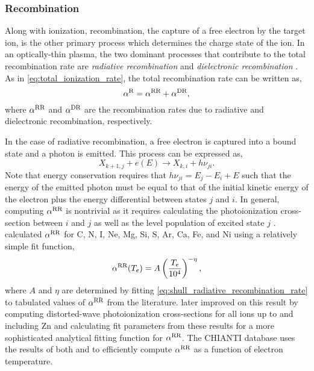 \subsubsection{Recombination}

Along with ionization, recombination, the capture of a free electron by the target ion, is the other primary process which determines the charge state of the ion. In an optically-thin plasma, the two dominant processes that contribute to the total recombination rate are \textit{radiative recombination} and \textit{dielectronic recombination} \citep{bradshaw_collisional_2013}. As in \autoref{eq:total_ionization_rate}, the total recombination rate can be written as,
\begin{equation}\label{eq:total_recombination_rate}
    \alpha^\textup{R} = \alpha^\textup{RR} + \alpha^\textup{DR},
\end{equation}
where $\alpha^\textup{RR}$ and $\alpha^\textup{DR}$ are the recombination rates due to radiative and dielectronic recombination, respectively.

In the case of radiative recombination, a free electron is captured into a bound state and a photon is emitted. This process can be expressed as,
\begin{equation}\label{eq:radiative_recombination}
    X_{k+1,j} + e(E) \to X_{k,i} + h\nu_{ji}.
\end{equation}
Note that energy conservation requires that $h\nu_{ji}=E_j - E_i + E$ such that the energy of the emitted photon must be equal to that of the initial kinetic energy of the electron plus the energy differential between states $j$ and $i$. In general, computing $\alpha^\textup{RR}$ is nontrivial as it requires calculating the photoionization cross-section between $i$ and $j$ as well as the level population of excited state $j$ \citep[see Equation 4.47 of][]{phillips_ultraviolet_2008}. \citet{shull_ionization_1982} calculated $\alpha^\textup{RR}$ for C, N, I, Ne, Mg, Si, S, Ar, Ca, Fe, and Ni using a relatively simple fit function,
\begin{equation}\label{eq:shull_radiative_recombination_rate}
    \alpha^\textup{RR}(T_e) = A\left(\frac{T_e}{10^4}\right)^{-\eta},
\end{equation}
where $A$ and $\eta$ are determined by fitting \autoref{eq:shull_radiative_recombination_rate} to tabulated values of $\alpha^\textup{RR}$ from the literature. \citet{badnell_radiative_2006} later improved on this result by computing distorted-wave photoionization cross-sections for all ions up to and including Zn and calculating fit parameters from these results for a more sophisticated analytical fitting function for $\alpha^\textup{RR}$\citep[see Equation 4 of][]{verner_atomic_1996}. The CHIANTI database uses the results of both \citet{shull_ionization_1982} and \citet{badnell_radiative_2006} to efficiently compute $\alpha^\textup{RR}$ as a function of electron temperature.


